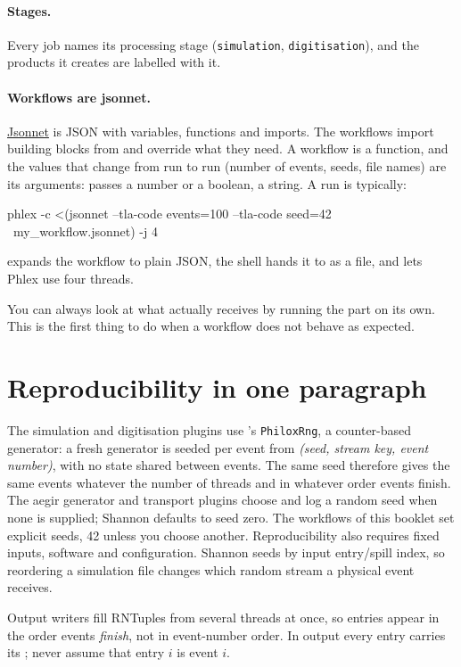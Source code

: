 \paragraph{Stages.} Every job names its processing stage
(\texttt{simulation}, \texttt{digitisation}), and the products it creates are
labelled with it.

\paragraph{Workflows are jsonnet.}
\href{https://jsonnet.org}{Jsonnet} is JSON with variables, functions and
imports. The  workflows import building blocks from
 and override what they need. A workflow is a
function, and the values that change from run to run (number of events,
seeds, file names) are its arguments:  passes a number or a
boolean,  a string. A run is typically:

\begin{shell}
phlex -c <(jsonnet --tla-code events=100 --tla-code seed=42 \
                   my_workflow.jsonnet) -j 4
\end{shell}

 expands the workflow to plain JSON, the shell hands it to
\cmd{phlex} as a file, and \cmd{-j 4} lets Phlex use four threads.

\begin{note}
You can always look at what  actually receives by running the
\cmd{jsonnet} part on its own. This is the first thing to do when a workflow
does not behave as expected.
\end{note}

\section{Reproducibility in one paragraph}

The simulation and digitisation plugins use 's
\texttt{PhiloxRng}, a counter-based generator: a fresh generator is seeded per
event from \emph{(seed, stream key, event number)}, with no state shared
between events. The same seed therefore gives the same events whatever the
number of threads and in whatever order events finish. The aegir generator and transport plugins choose and log a random seed
when none is supplied; Shannon defaults to seed zero. The workflows of this
booklet set explicit seeds, 42 unless you choose another. Reproducibility also requires fixed inputs, software and
configuration. Shannon seeds by input entry/spill index, so reordering a
simulation file changes which random stream a physical event receives.

\begin{pitfall}
Output writers fill RNTuples from several threads at once, so entries appear
in the order events \emph{finish}, not in event-number order. In \pkg{aegir}
output every entry carries its \field{event\_number}; never assume that entry
$i$ is event $i$.
\end{pitfall}
